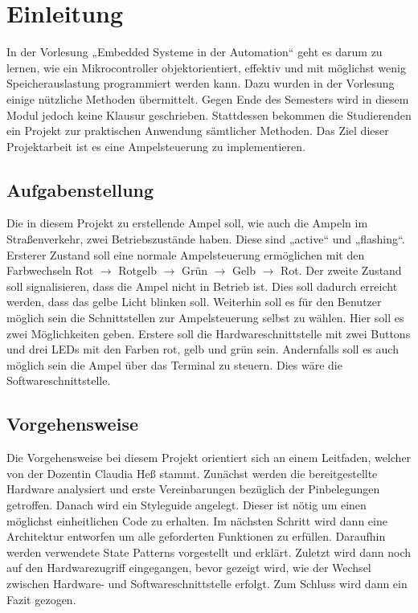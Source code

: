 \chapter{Einleitung}
In der Vorlesung „Embedded Systeme in der Automation“ geht es darum zu lernen, wie ein Mikrocontroller objektorientiert, effektiv und mit möglichst wenig Speicherauslastung programmiert werden kann. Dazu wurden in der Vorlesung einige nützliche Methoden übermittelt. Gegen Ende des Semesters wird in diesem Modul jedoch keine Klausur geschrieben. Stattdessen bekommen die Studierenden ein Projekt zur praktischen Anwendung sämtlicher Methoden. Das Ziel dieser Projektarbeit ist es eine Ampelsteuerung zu implementieren.

\section{Aufgabenstellung}
Die in diesem Projekt zu erstellende Ampel soll, wie auch die Ampeln im Straßenverkehr, zwei Betriebszustände haben. Diese sind „active“ und „flashing“. Ersterer Zustand soll eine normale Ampelsteuerung ermöglichen mit den Farbwechseln Rot $\rightarrow$ Rotgelb $\rightarrow$ Grün $\rightarrow$ Gelb $\rightarrow$ Rot. Der zweite Zustand soll signalisieren, dass die Ampel nicht in Betrieb ist. Dies soll dadurch erreicht werden, dass das gelbe Licht blinken soll. Weiterhin soll es für den Benutzer möglich sein die Schnittstellen zur Ampelsteuerung selbst zu wählen. Hier soll es zwei Möglichkeiten geben. Erstere soll die Hardwareschnittstelle mit zwei Buttons und drei LEDs mit den Farben rot, gelb und grün sein. Andernfalls soll es auch möglich sein die Ampel über das Terminal zu steuern. Dies wäre die Softwareschnittstelle.\\

\section{Vorgehensweise}

Die Vorgehensweise bei diesem Projekt orientiert sich an einem Leitfaden, welcher von der Dozentin Claudia Heß stammt. Zunächst werden die bereitgestellte Hardware analysiert und erste Vereinbarungen bezüglich der Pinbelegungen getroffen. Danach wird ein Styleguide angelegt. Dieser ist nötig um einen möglichst einheitlichen Code zu erhalten. Im nächsten Schritt wird dann eine Architektur entworfen um alle geforderten Funktionen zu erfüllen. Daraufhin werden verwendete State Patterns vorgestellt und erklärt. Zuletzt wird dann noch auf den Hardwarezugriff eingegangen, bevor gezeigt wird, wie der Wechsel zwischen Hardware- und Softwareschnittstelle erfolgt. Zum Schluss wird dann ein Fazit gezogen.